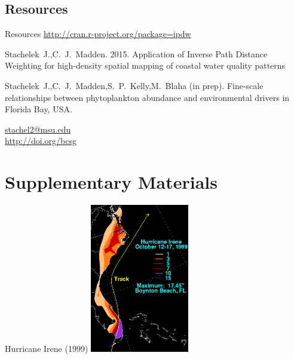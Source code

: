 \documentclass[compress,noflama,nosectionpages]{beamer}
\begin{document}
\subsection{Resources}
\begin{frame}{Resources}
  \centering
  \url{http://cran.r-project.org/package=ipdw}
  \begin{thebibliography}{10}
  \beamertemplatearticlebibitems
	Stachelek~J.,C.~J.~Madden. 2015. Application of Inverse Path Distance Weighting for high-density spatial mapping of coastal water quality patterns
	\newblock {}
	
	Stachelek~J.,C.~J.~Madden,S.~P.~Kelly,M.~Blaha (in prep). Fine-scale relationships between phytoplankton abundance and environmental drivers in Florida Bay, USA.
  \end{thebibliography}
  
  \vspace{3pt}
	\begin{center}
	\url{stachel2@msu.edu}\\
	\url{http://doi.org/bcsg}
	\end{center}
	\vspace{3pt}

\end{frame}

\section{Supplementary Materials}

\begin{frame}{Hurricane Irene (1999)}
	\centering
	\includegraphics[height=6.5cm,keepaspectratio=true,trim= 1mm 0mm 1mm 10mm,clip=TRUE]{images/Irene_1999_rainfall.png}\\
\end{frame}
\end{document}
